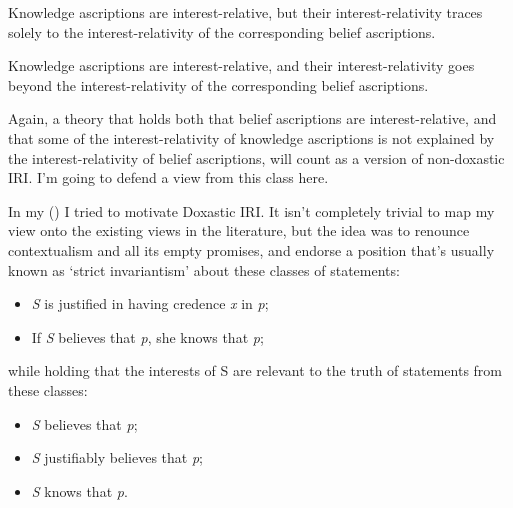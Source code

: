 \documentclass[
  11pt,
  letterpaper,
  DIV=11,
  numbers=noendperiod,
  twoside]{scrartcl}
\providecommand{\tightlist}{%
  \setlength{\itemsep}{0pt}\setlength{\parskip}{0pt}}\usepackage{longtable,booktabs,array}
\begin{document}
\begin{description}
\tightlist
\item[Doxastic IRI]
Knowledge ascriptions are interest-relative, but their
interest-relativity traces solely to the interest-relativity of the
corresponding belief ascriptions.
\item[Non-Doxastic IRI]
Knowledge ascriptions are interest-relative, and their
interest-relativity goes beyond the interest-relativity of the
corresponding belief ascriptions.
\end{description}

Again, a theory that holds both that belief ascriptions are
interest-relative, and that some of the interest-relativity of knowledge
ascriptions is not explained by the interest-relativity of belief
ascriptions, will count as a version of non-doxastic IRI. I'm going to
defend a view from this class here.

In my () I tried to motivate
Doxastic IRI. It isn't completely trivial to map my view onto the
existing views in the literature, but the idea was to renounce
contextualism and all its empty promises, and endorse a position that's
usually known as `strict invariantism' about these classes of
statements:

\begin{itemize}
\tightlist
\item
  \emph{S} is justified in having credence \emph{x} in \emph{p};
\item
  If \emph{S} believes that \emph{p}, she knows that \emph{p};
\end{itemize}

while holding that the interests of S are relevant to the truth of
statements from these classes:

\begin{itemize}
\tightlist
\item
  \emph{S} believes that \emph{p};
\item
  \emph{S} justifiably believes that \emph{p};
\item
  \emph{S} knows that \emph{p}.
\end{itemize}
\end{document}
